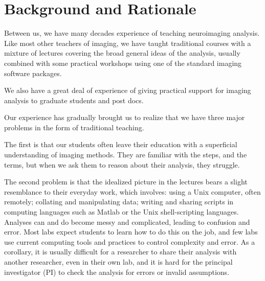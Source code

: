 
\section{Background and Rationale}\label{background}

Between us, we have many decades experience of teaching neuroimaging analysis.
Like most other teachers of imaging, we have taught traditional courses with a
mixture of lectures covering the broad general ideas of the analysis, usually
combined with some practical workshops using one of the standard imaging
software packages.

We also have a great deal of experience of giving practical support for
imaging analysis to graduate students and post docs.

Our experience has gradually brought us to realize that we have three major
problems in the form of traditional teaching.

The first is that our students often leave their education with a superficial
understanding of imaging methods.  They are familiar with the steps, and the
terms, but when we ask them to reason about their analysis, they struggle.

The second problem is that the idealized picture in the lectures bears a
slight resemblance to their everyday work, which involves: using a Unix
computer, often remotely; collating and manipulating data; writing and sharing
scripts in computing languages such as Matlab or the Unix shell-scripting
languages.  Analyses can and do become messy and complicated, leading to
confusion and error.  Most labs expect students to learn how to do this on the
job, and few labs use current computing tools and practices to control 
complexity and error.  As a corollary, it is usually difficult for a
researcher to share their analysis with another researcher, even in their own
lab, and it is hard for the principal investigator (PI) to check the analysis
for errors or invalid assumptions.


